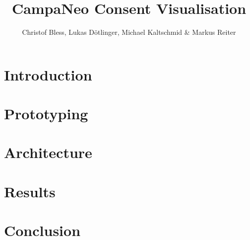 \documentclass{article}
\title{CampaNeo Consent Visualisation}
\author{Christof Bless, Lukas Dötlinger, Michael Kaltschmid \& Markus Reiter}
\begin{document}
\maketitle

\newpage

\section{Introduction}
\label{sec:introduction}

\section{Prototyping}
\label{sec:conclusion}

\section{Architecture}
\label{sec:conclusion}

\section{Results}
\label{sec:conclusion}

\section{Conclusion}
\label{sec:conclusion}

\newpage
\printbibliography
\end{document}
